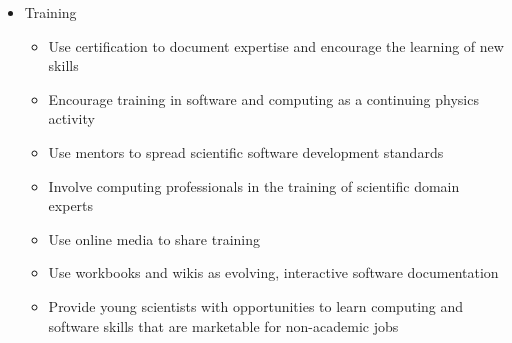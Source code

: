 \begin{itemize}
    \item Training
    \begin{itemize}
        \item Use certification to document expertise and encourage the learning of
new skills
        \item Encourage training in software and computing as a continuing physics activity
        \item Use mentors to spread scientific software development standards
        \item Involve computing professionals in the training of scientific domain experts
        \item Use online media to share training
        \item Use workbooks and wikis as evolving, interactive software documentation
        \item Provide young scientists with opportunities to learn computing and software skills that are marketable for non-academic jobs
    \end{itemize}

\end{itemize}

